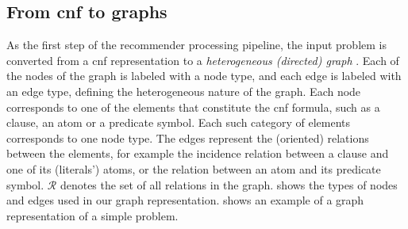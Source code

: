 \begin{figure}[h]

\fi

\end{figure}

\subsection{From \gls{cnf} to graphs}
\label{sec:graphifier}

As the first step of the recommender processing pipeline,
the input problem is converted from a \gls{cnf} representation
to a \emph{heterogeneous (directed) graph} \cite{Zhou2018}.
Each of the nodes of the graph is labeled with a node type,
and each edge is labeled with an edge type,
defining the heterogeneous nature of the graph.
Each node corresponds to one of the elements that constitute the \gls{cnf} formula,
such as a clause, an atom or a predicate symbol.
Each such category of elements corresponds to one node type.
The edges represent the (oriented) relations between the elements,
for example the incidence relation between a clause and one of its (literals') atoms,
or the relation between an atom and its predicate symbol.
$\mathcal{R}$ denotes the set of all relations in the graph.
 shows the types of nodes and edges used in our graph representation.
 shows an example of a graph representation of a simple problem.

